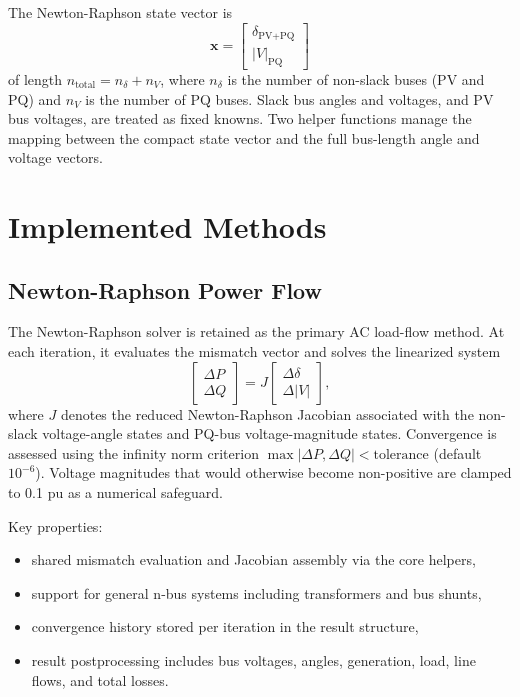 \documentclass[12pt,a4paper]{article}
\begin{document}
The Newton-Raphson state vector is
\[
\mathbf{x} = \begin{bmatrix} \delta_{\text{PV+PQ}} \\ |V|_{\text{PQ}} \end{bmatrix}
\]
of length $n_{\text{total}} = n_\delta + n_V$, where $n_\delta$ is the number of non-slack buses (PV and PQ) and $n_V$ is the number of PQ buses. Slack bus angles and voltages, and PV bus voltages, are treated as fixed knowns. Two helper functions manage the mapping between the compact state vector and the full bus-length angle and voltage vectors.

\section{Implemented Methods}

\subsection{Newton-Raphson Power Flow}

The Newton-Raphson solver is retained as the primary AC load-flow method. At each iteration, it evaluates the mismatch vector and solves the linearized system
\[
\begin{bmatrix} \Delta P \\ \Delta Q \end{bmatrix}
= J
\begin{bmatrix} \Delta\delta \\ \Delta|V| \end{bmatrix},
\]
where \(J\) denotes the reduced Newton-Raphson Jacobian associated with the non-slack voltage-angle states and PQ-bus voltage-magnitude states.
Convergence is assessed using the infinity norm criterion $\max|\Delta P, \Delta Q| < \text{tolerance}$ (default \(10^{-6}\)). Voltage magnitudes that would otherwise become non-positive are clamped to 0.1 pu as a numerical safeguard.

Key properties:
\begin{itemize}[leftmargin=1.5em]
    \item shared mismatch evaluation and Jacobian assembly via the core helpers,
    \item support for general n-bus systems including transformers and bus shunts,
    \item convergence history stored per iteration in the result structure,
    \item result postprocessing includes bus voltages, angles, generation, load, line flows, and total losses.
\end{itemize}
\end{document}
